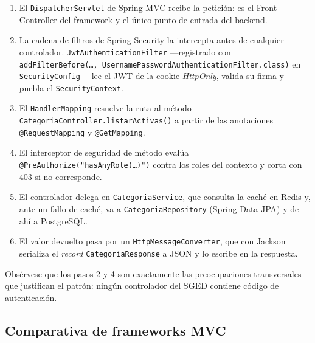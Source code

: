 \documentclass[12pt,a4paper]{article}
\begin{document}
\begin{enumerate}
  \item El \texttt{DispatcherServlet} de Spring MVC recibe la petición: es el Front Controller
        del framework y el único punto de entrada del backend.
  \item La cadena de filtros de Spring Security la intercepta antes de cualquier controlador.
        \texttt{JwtAuthenticationFilter} ---registrado con \texttt{addFilterBefore(\dots,
        UsernamePasswordAuthenticationFilter.class)} en \texttt{SecurityConfig}--- lee el JWT de
        la cookie \textit{HttpOnly}, valida su firma y puebla el \texttt{SecurityContext}.
  \item El \texttt{HandlerMapping} resuelve la ruta al método
        \texttt{CategoriaController.listarActivas()} a partir de las anotaciones
        \texttt{@RequestMapping} y \texttt{@GetMapping}.
  \item El interceptor de seguridad de método evalúa
        \texttt{@PreAuthorize("hasAnyRole(\dots)")} contra los roles del contexto y corta con
        403 si no corresponde.
  \item El controlador delega en \texttt{CategoriaService}, que consulta la caché en Redis y,
        ante un fallo de caché, va a \texttt{CategoriaRepository} (Spring Data JPA) y de ahí a
        PostgreSQL.
  \item El valor devuelto pasa por un \texttt{HttpMessageConverter}, que con Jackson serializa
        el \textit{record} \texttt{CategoriaResponse} a JSON y lo escribe en la respuesta.
\end{enumerate}

Obsérvese que los pasos 2 y 4 son exactamente las preocupaciones transversales que justifican el
patrón: ningún controlador del SGED contiene código de autenticación.

\subsection{Comparativa de frameworks MVC}
\end{document}
